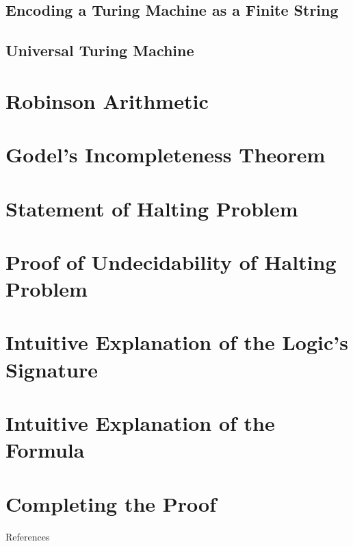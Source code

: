 \documentclass[
11pt,notheorems,hyperref={pdfauthor=whatever}
]{beamer}
\begin{document}
\subsection{Encoding a Turing Machine as a Finite String}
\begin{frame}
\end{frame}

\subsection{Universal Turing Machine}
\begin{frame}
\end{frame}

\section{Robinson Arithmetic}
\begin{frame}
\end{frame}

\section{Godel's Incompleteness Theorem}
\begin{frame}
\end{frame}


\section{Statement of Halting Problem}
\begin{frame}
\end{frame}

\section{Proof of Undecidability of Halting Problem}
\begin{frame}
\end{frame}


\section{Intuitive Explanation of the Logic's Signature}
\begin{frame}
\end{frame}

\section{Intuitive Explanation of the Formula}
\begin{frame}
\end{frame}

\section{Completing the Proof}
\begin{frame}
\end{frame}

\begin{frame}[allowframebreaks]{References}
    \printbibliography
\end{frame}
\end{document}

